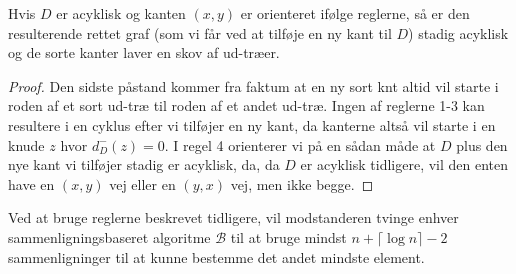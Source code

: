 \begin{lemma}
	Hvis $D$ er acyklisk og kanten $(x,y)$ er orienteret ifølge reglerne, så er den resulterende rettet graf (som vi får ved at tilføje en ny kant til $D$) stadig acyklisk og de sorte kanter laver en skov af ud-træer.
\end{lemma}
\begin{proof}
	Den sidste påstand kommer fra faktum at en ny sort knt altid vil starte i roden af et sort ud-træ til roden af et andet ud-træ. Ingen af reglerne 1-3 kan resultere i en cyklus efter vi tilføjer en ny kant, da kanterne altså vil starte i en knude $z$ hvor $d_{D}^{-}(z) = 0$. I regel 4 orienterer vi på en sådan måde at $D$ plus den nye kant vi tilføjer stadig er acyklisk, da, da $D$ er acyklisk tidligere, vil den enten have en $(x,y)$ vej eller en $(y,x)$ vej, men ikke begge.
\end{proof}

\begin{theorem}
	Ved at bruge reglerne beskrevet tidligere, vil modstanderen tvinge enhver sammenligningsbaseret algoritme $\mathcal{B}$ til at bruge mindst $n + \lceil \log n \rceil - 2$ sammenligninger til at kunne bestemme det andet mindste element.
\end{theorem}

